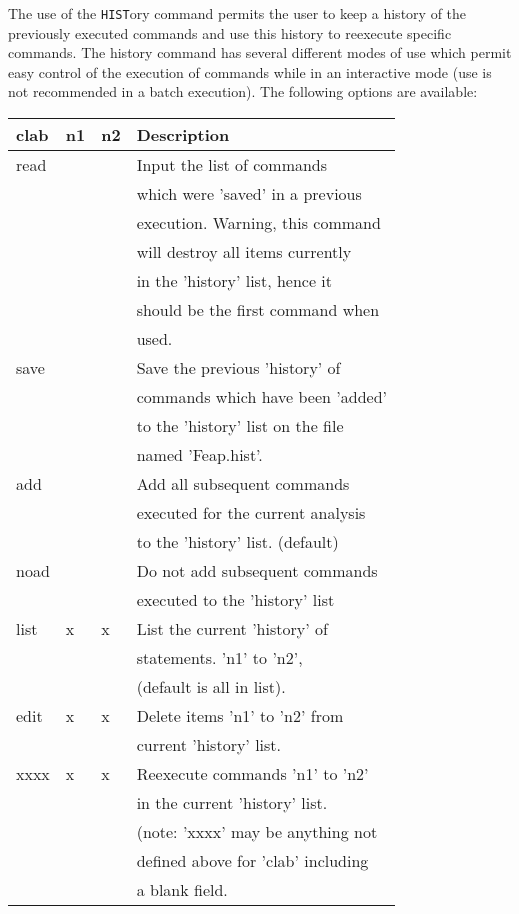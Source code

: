 \headb

The use of the {\tt HIST}ory command permits the user to keep a
history of the previously executed commands and use
this history to reexecute specific commands.  The history
command has several different modes of use which permit easy
control of the execution of commands while in an
interactive mode (use is not recommended in a batch
execution).  The following options are available:

\begin{center}
\begin{tabular}{ l | l | l | l }
clab & n1 & n2 & Description \\ \hline
read &   &   & Input the list of commands   \\
     &   &   & which were 'saved' in a previous   \\
     &   &   & execution.  Warning, this command  \\
     &   &   & will destroy all items currently   \\
     &   &   & in the 'history' list, hence it    \\
     &   &   & should be the first command when   \\
     &   &   & used.                              \\ \hline
save &   &   & Save the previous 'history' of     \\
     &   &   & commands which have been 'added'   \\
     &   &   & to the 'history' list on the file  \\
     &   &   & named 'Feap.hist'.                 \\ \hline
add  &   &   & Add all subsequent commands  \\
     &   &   & executed for the current analysis  \\
     &   &   & to the 'history' list. (default)   \\
noad &   &   & Do not add subsequent commands   \\
     &   &   & executed to the 'history' list   \\ \hline
list & x & x & List the current 'history' of      \\
     &   &   & statements. 'n1' to 'n2',          \\
     &   &   & (default is all in list).          \\
edit & x & x & Delete items 'n1' to 'n2' from     \\
     &   &   & current 'history' list.            \\ \hline
xxxx & x & x & Reexecute commands 'n1' to 'n2'    \\
     &   &   & in the current 'history' list.  \\
     &   &   & (note: 'xxxx' may be anything not  \\
     &   &   & defined above for 'clab' including \\
     &   &   & a blank field.                     \\ 
\end{tabular}
\end{center} 

